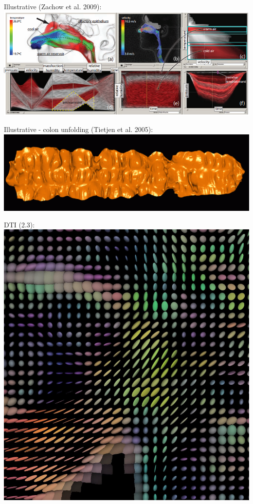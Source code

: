 \documentclass{beamer}
\begin{document}
\begin{frame}
	Illustrative (Zachow et al. 2009):
	\includegraphics[width=\textwidth]{images/nose}
\end{frame}

\begin{frame}
	Illustrative - colon unfolding (Tietjen et al. 2005):
	\includegraphics[width=\textwidth]{images/colon}
\end{frame}

\begin{frame}
	DTI (2.3):
	\includegraphics[width=\textwidth]{images/dti}
\end{frame}
\end{document}
